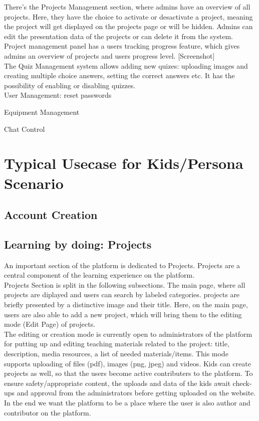 There's the Projects Management section, where admins have an overview of all projects. Here, they have the choice to activate or desactivate a project, meaning the project will get displayed on the projects page or will be hidden. Admins can edit the presentation data of the projects or can delete it from the system. 
Project management panel has a users tracking progress feature, which gives admins an overview of projects and users progress level.
[Screenshot]\\

The Quiz Management system allows adding new quizes: uploading images and creating multiple choice answers, setting the correct answers etc. It has the possibility of enabling or disabling quizzes. \\

User Management: reset passwords

Equipment Management

Chat Control


\section{Typical Usecase for Kids/Persona Scenario}


\subsection{Account Creation}

\subsection{Learning by doing: Projects}

An important section of the platform is dedicated to Projects. Projects are a central component of the learning experience on the platform. \\

Projects Section is split in the following subsections. The main page, where all projects are diplayed and users can search by labeled categories. projects are briefly presented by a distinctive image and their title. Here, on the main page, users are also able to add a new project, which will bring them to the editing mode (Edit Page) of projects. \\

The editing or creation mode is currently open to administrators of the platform for putting up and editing teaching materials related to the project: title, description, media resources, a list of needed materials/items. This mode supports uploading of files (pdf), images (png, jpeg) and videos.
Kids can create projects as well, so that the users become active contributers to the platform. To ensure safety/appropriate content, the uploads and data of the kids await check-ups and approval from the administrators before getting uploaded on the website.
In the end we want the platform to be a place where the user is also author and contributor on the platform. \\

